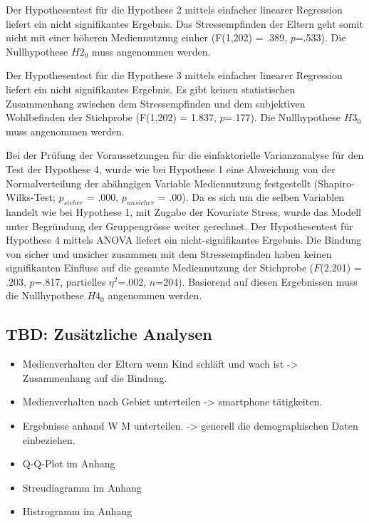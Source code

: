 Der Hypothesentest für die Hypothese 2 mittels einfacher linearer Regression liefert ein nicht signifikantes Ergebnis. Das Stressempfinden der Eltern geht somit nicht mit einer höheren Mediennutzung einher (F(1,202) = .389, $p$=.533). Die Nullhypothese $H2_{0}$ muss angenommen werden.

Der Hypothesentest für die Hypothese 3 mittels einfacher linearer Regression liefert ein nicht signifikantes Ergebnis. Es gibt keinen statistischen Zusammenhang zwischen dem Stressempfinden und dem subjektiven Wohlbefinden der Stichprobe (F(1,202) = 1.837, $p$=.177).  Die Nullhypothese $H3_{0}$ muss angenommen werden.

Bei der Prüfung der Voraussetzungen für die einfaktorielle Varianzanalyse für den Test der Hypothese 4, wurde wie bei Hypothese 1 eine Abweichung von der Normalverteilung der abähngigen Variable Mediennutzung festgestellt (Shapiro-Wilks-Test; $p_{sicher}$ = .000, $p_{unsicher}$ = .00). Da es sich um die selben Variablen handelt wie bei Hypothese 1, mit Zugabe der Kovariate Stress, wurde das Modell unter Begründung der Gruppengrösse weiter gerechnet. Der Hypothesentest für Hypothese 4 mittels ANOVA liefert ein nicht-signifikantes Er\-gebnis. Die Bindung von sicher und unsicher zusammen mit dem Stressempfinden haben keinen signifikanten Einfluss auf die ge\-samte Medien\-nutzung der Stichprobe ($F$(2,201) = .203, $p$=.817, partielles $\eta^2$=.002, $n$=204). Basierend auf diesen Ergebnissen muss die Nullhypothese $H4_{0}$ angenommen werden. 

\subsection{TBD: Zusätzliche Analysen} \label{sec:ZusätzlicheAnalysen}

\begin{itemize}
    \item Medienverhalten der Eltern wenn Kind schläft und wach ist -> Zusammenhang auf die Bindung.
    \item Medienverhalten nach Gebiet unterteilen -> smartphone tätigkeiten.
    \item Ergebnisse anhand W M unterteilen. -> generell die demographischen Daten einbeziehen.
\end{itemize}



\begin{itemize}
    \item Q-Q-Plot im Anhang
    \item Streudiagramm im Anhang
    \item Histrogramm im Anhang
\end{itemize}



